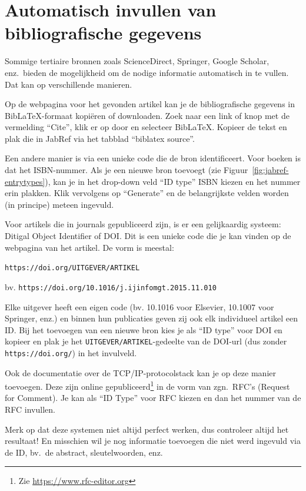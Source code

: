 \section{Automatisch invullen van bibliografische gegevens}%
\label{sec:automatisch_invullen_van_bibliografische_gegevens}

Sommige tertiaire bronnen zoals ScienceDirect, Springer, Google Scholar, enz.\ bieden de mogelijkheid om de nodige informatie automatisch in te vullen. Dat kan op verschillende manieren.

Op de webpagina voor het gevonden artikel kan je de bibliografische gegevens in Bib{\LaTeX}-formaat kopiëren of downloaden. Zoek naar een link of knop met de vermelding ``Cite'', klik er op door en selecteer Bib{\LaTeX}. Kopieer de tekst en plak die in JabRef via het tabblad ``biblatex source''.

Een andere manier is via een unieke code die de bron identificeert. Voor boeken is dat het ISBN-nummer. Als je een nieuwe bron toevoegt (zie Figuur~\ref{fig:jabref-entrytypes}), kan je in het drop-down veld ``ID type'' ISBN kiezen en het nummer erin plakken. Klik vervolgens op ``Generate'' en de belangrijkste velden worden (in principe) meteen ingevuld.

Voor artikels die in journals gepubliceerd zijn, is er een gelijkaardig systeem: Ditigal Object Identifier of DOI. Dit is een unieke code die je kan vinden op de webpagina van het artikel. De vorm is meestal:

\begin{center}
  \texttt{https://doi.org/UITGEVER/ARTIKEL}

  bv. \texttt{https://doi.org/10.1016/j.ijinfomgt.2015.11.010}
\end{center}

Elke uitgever heeft een eigen code (bv. 10.1016 voor Elsevier, 10.1007 voor Springer, enz.) en binnen hun publicaties geven zij ook elk individueel artikel een ID. Bij het toevoegen van een nieuwe bron kies je als ``ID type'' voor DOI en kopieer en plak je het \texttt{UITGEVER/ARTIKEL}-gedeelte van de DOI-url (dus zonder \texttt{https://doi.org/}) in het invulveld.

Ook de documentatie over de TCP/IP-protocolstack kan je op deze manier toevoegen. Deze zijn online gepubliceerd\footnote{Zie \url{https://www.rfc-editor.org}} in de vorm van zgn.~RFC's (Request for Comment). Je kan als ``ID Type'' voor RFC kiezen en dan het nummer van de RFC invullen.

Merk op dat deze systemen niet altijd perfect werken, dus controleer altijd het resultaat! En misschien wil je nog informatie toevoegen die niet werd ingevuld via de ID, bv.\ de abstract, sleutelwoorden, enz.


